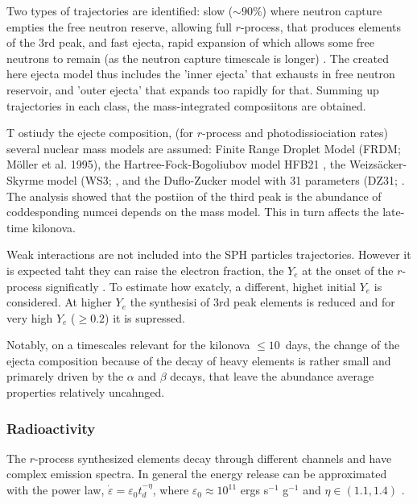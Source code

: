 \documentclass[11pt,a4paper,headinclude=true,DIV=14,BCOR=8mm,chapterprefix,listof=totoc,twoside,openright,abstracton]{scrbook}
\begin{document}
Two types of trajectories are identified: slow ($\sim 90\%$) where neutron capture empties the free neutron reserve, allowing full $r$-process, that produces elements of the 3rd peak, and fast ejecta, rapid expansion of which allows some free neutrons to remain (as the neutron capture timescale is longer) \cite{(see also: Just et al. 2015; Goriely et al. 2014; Metzger et al. 2015; Mendoza-Temis et al. 2015).}.
The created here ejecta model thus includes the 'inner ejecta' that exhausts in free neutron reservoir, and 'outer ejecta' that expands too rapidly for that. Summing up trajectories in each class, the mass-integrated composiitons are obtained. 

T ostiudy the ejecte composition, (for $r$-process and photodissiociation rates) several nuclear mass models are assumed: Finite Range Droplet Model (FRDM; Möller et al. 1995),
the Hartree-Fock-Bogoliubov model HFB21 \cite{(Goriely et al. 2010)}, the Weizsäcker-Skyrme
model (WS3; \cite{Liu et al. 2011)}, and the Duflo-Zucker model with 31 parameters (DZ31; \cite{Duflo & Zuker 1995)}. The analysis showed that the postiion of the third peak is the abundance of coddesponding numcei depends on the mass model. This in turn affects the late-time kilonova.

Weak interactions are not included into the SPH particles trajectories. However it is expected taht they can raise the electron fraction, the $Y_e$ at the onset of the $r$-process significatly \cite{(Wanajo et al. 2014; Sekiguchi et al. 2015; Goriely et al. 2015)}. To estimate how exatcly, a different, highet initial $Y_e$ is considered. At higher $Y_e$ the synthesisi of $3$rd peak elements is reduced and for very high $Y_e$ ($\geq0.2$) it is supressed.

Notably, on a timescales relevant for the kilonova $\leq10$~days, the change of the ejecta composition because of the decay of heavy elements is rather small and primarely driven by the $\alpha$ and $\beta$ decays, that leave the abundance average properties relatively uncahnged. 


\subsubsection{Radioactivity}

The $r$-process synthesized elements decay through different channels and have complex emission spectra. In general the energy release can be approximated with the power law, $\dot{\varepsilon}=\varepsilon_0 t_d^{-\eta}$, where $\varepsilon_0\approx 10^{11}$ ergs s$^{-1}$ g$^{-1}$ and $\eta\in(1.1,1.4)$ \cite{(Metzger et al. 2010; Roberts et al. 2011; Goriely et al. 2011; Korobkin et al. 2012)}.
\end{document}
